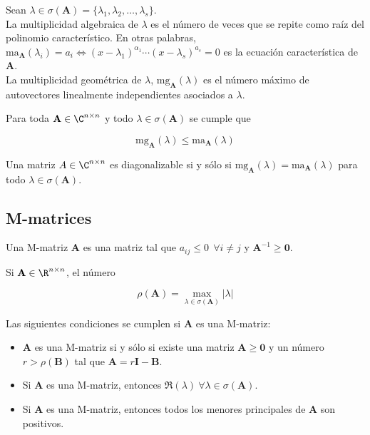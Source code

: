 \begin{defi}
Sean $\lambda \in \sigma(\mathbf{A}) = \{\lambda_1, \lambda_2, \dots, \lambda_s\}$.\\

La multiplicidad algebraica de $\lambda$ es el número de veces que se repite como raíz del polinomio característico. En otras palabras, $\mathrm{ma}_\mathbf{A}(\lambda_i) = a_i \iff (x-\lambda_1)^{\alpha_1} \cdots (x - \lambda_s)^{a_s}  = 0$ es la ecuación característica de $\mathbf{A}$.\\

La multiplicidad geométrica de $\lambda$, $\mathrm{mg}_\mathbf{A}(\lambda)$ es el número máximo de autovectores linealmente independientes asociados a $\lambda$.
\end{defi}

\begin{defi}
Para toda $\mathbf{A} \in \C^{n \times n}$ y todo $\lambda \in \sigma(\mathbf{A})$ se cumple que

\[ \mathrm{mg}_\mathbf{A}(\lambda) \leq \mathrm{ma}_\mathbf{A}(\lambda) \]
\end{defi}

\begin{teo}
Una matriz $A \in \C^{n \times n}$ es diagonalizable si y sólo si $\mathrm{mg}_\mathbf{A}(\lambda) = \mathrm{ma}_\mathbf{A}(\lambda)$ para todo $\lambda \in \sigma(\mathbf{A})$.
\end{teo}

\subsection{M-matrices} \label{sec:m_matrices}

\begin{defi}
Una M-matriz $\mathbf{A}$ es una matriz tal que $a_{ij} \leq 0 \ \ \forall i \neq j$ y $\mathbf{A}^{-1} \geq \mathbf{0}$.
\end{defi}

\begin{defi}
Si $\mathbf{A} \in \R^{n\times n}$, el número 

\[\rho(\mathbf{A}) = \max_{\lambda \in \sigma(\mathbf{A})} |\lambda|\]
\end{defi}

\begin{prop}
Las siguientes condiciones se cumplen si $\mathbf{A}$ es una M-matriz:

\begin{itemize}
\item $\mathbf{A}$ es una M-matriz si y sólo si existe una matriz $\mathbf{A} \geq \mathbf{0}$ y un número $r > \rho(\mathbf{B})$ tal que $\mathbf{A} = r\mathbf{I} - \mathbf{B}$.
\item Si $\mathbf{A}$ es una M-matriz, entonces $\Re(\lambda) \ \forall \lambda \in \sigma(\mathbf{A})$.
\item Si $\mathbf{A}$ es una M-matriz, entonces todos los menores principales de $\mathbf{A}$ son positivos.
\end{itemize}
\end{prop}

